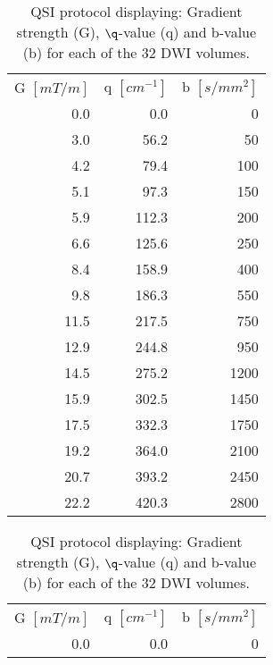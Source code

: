   \begin{table}
      \centering
     \caption{QSI protocol displaying: Gradient strength (G), $\q$-value (q) and b-value (b) for each of the 32 DWI volumes.}
		 \begin{adjustbox}{width={0.47\textwidth},keepaspectratio}
        \begin{tabular}{rrr}
        \addlinespace
            \multicolumn{3}{l}{}\\
        \toprule
            G $[mT/m]$ & q $[cm^{-1}]$ & b $[s/mm^2]$ \\
            \cmidrule(r){1-1}\cmidrule(lr){2-2}\cmidrule(l){3-3}
            0.0   & 0.0   & 0 \\
            3.0   & 56.2  & 50 \\
            4.2   & 79.4  & 100 \\
            5.1   & 97.3  & 150 \\
            5.9   & 112.3 & 200 \\
            6.6   & 125.6 & 250 \\
            8.4   & 158.9 & 400 \\
            9.8   & 186.3 & 550 \\
            11.5  & 217.5 & 750 \\
            12.9  & 244.8 & 950 \\
            14.5  & 275.2 & 1200 \\
            15.9  & 302.5 & 1450 \\
            17.5  & 332.3 & 1750 \\
            19.2  & 364.0 & 2100 \\
            20.7  & 393.2 & 2450 \\
            22.2  & 420.3 & 2800 \\
            \bottomrule
        \end{tabular}%
		 \end{adjustbox}
        \hspace{0.02\textwidth}%
		  \begin{adjustbox}{width={0.47\textwidth},keepaspectratio}
        \begin{tabular}{rrr}
        \addlinespace
            \multicolumn{3}{l}{\textit{... continued}}\\
        \toprule
            G $[mT/m]$ & q $[cm^{-1}]$ & b $[s/mm^2]$ \\
            \cmidrule(r){1-1}\cmidrule(lr){2-2}\cmidrule(l){3-3}
            0.0   & 0.0   & 0 \\

\end{tabular}
\end{adjustbox}
\end{table}
